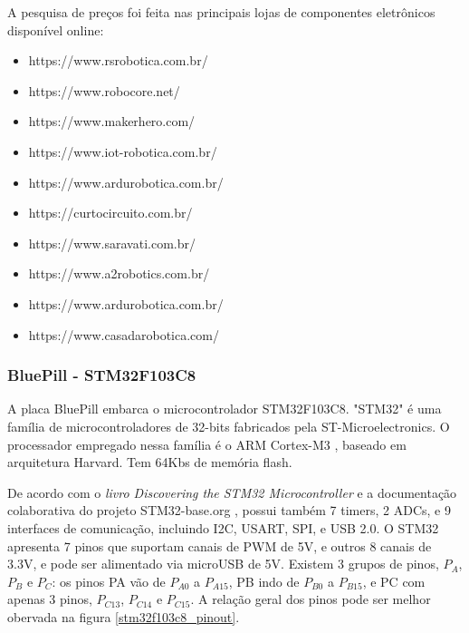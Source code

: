 A pesquisa de preços foi feita nas principais lojas de componentes eletrônicos disponível online:
\begin{itemize}
	\item https://www.rsrobotica.com.br/
	\item https://www.robocore.net/
	\item https://www.makerhero.com/
	\item https://www.iot-robotica.com.br/
	\item https://www.ardurobotica.com.br/
	\item https://curtocircuito.com.br/
	\item https://www.saravati.com.br/
	\item https://www.a2robotics.com.br/
	\item https://www.ardurobotica.com.br/
	\item https://www.casadarobotica.com/
\end{itemize}



\subsubsection{BluePill - STM32F103C8}

A placa BluePill embarca o microcontrolador STM32F103C8.
"STM32" é uma família de microcontroladores de 32-bits fabricados pela
ST-Microelectronics. O processador empregado nessa família é o ARM Cortex-M3 \cite{cortex_m3},
baseado em arquitetura Harvard. Tem 64Kbs de memória flash.

De acordo com o \textit{livro Discovering the STM32 Microcontroller} \cite{stm_doc} e 
a documentação colaborativa do projeto STM32-base.org \cite{stm32_base_org},
possui também 7 timers, 2 ADCs, e 9 interfaces de comunicação, incluindo I2C,  USART, SPI, e USB 2.0. 
O STM32 apresenta 7 pinos que suportam canais de PWM de 5V, e outros 8 canais de 3.3V, e pode ser alimentado
via microUSB de 5V. Existem 3 grupos de pinos,  $P_{A}$,  $P_{B}$ e  $P_{C}$: os pinos PA vão de $P_{A0}$ 
a $P_{A15}$, PB indo de $P_{B0}$ a $P_{B15}$, e PC com apenas 3 pinos, $P_{C13}$, $P_{C14}$ e $P_{C15}$.
A relação geral dos pinos pode ser melhor obervada na figura \ref{stm32f103c8_pinout}.

